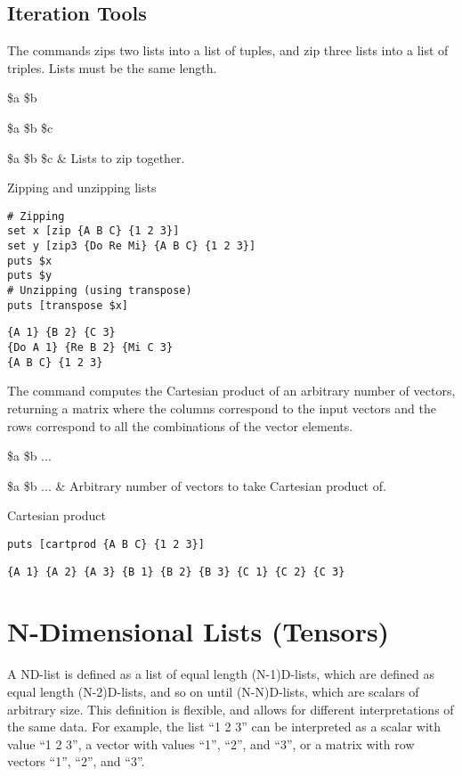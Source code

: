 \documentclass{article}
\begin{document}
\subsection{Iteration Tools}
The commands  zips two lists into a list of tuples, and  zip three lists into a list of triples. 
Lists must be the same length.
\begin{syntax}
 \$a \$b
\end{syntax}
\begin{syntax}
 \$a \$b \$c
\end{syntax}
\begin{args}
\$a \$b \$c & Lists to zip together.
\end{args}
\begin{example}{Zipping and unzipping lists}
\begin{lstlisting}
# Zipping
set x [zip {A B C} {1 2 3}]
set y [zip3 {Do Re Mi} {A B C} {1 2 3}]
puts $x
puts $y
# Unzipping (using transpose)
puts [transpose $x]
\end{lstlisting}
\tcblower
\begin{lstlisting}
{A 1} {B 2} {C 3}
{Do A 1} {Re B 2} {Mi C 3}
{A B C} {1 2 3}
\end{lstlisting}
\end{example}
The command  computes the Cartesian product of an arbitrary number of vectors, returning a matrix where the columns correspond to the input vectors and the rows correspond to all the combinations of the vector elements.
\begin{syntax}
 \$a \$b ...
\end{syntax}
\begin{args}
\$a \$b ... & Arbitrary number of vectors to take Cartesian product of.
\end{args}

\begin{example}{Cartesian product}
\begin{lstlisting}
puts [cartprod {A B C} {1 2 3}]
\end{lstlisting}
\tcblower
\begin{lstlisting}
{A 1} {A 2} {A 3} {B 1} {B 2} {B 3} {C 1} {C 2} {C 3}
\end{lstlisting}
\end{example}

\clearpage
\section{N-Dimensional Lists (Tensors)}
A ND-list is defined as a list of equal length (N-1)D-lists, which are defined as equal length (N-2)D-lists, and so on until (N-N)D-lists, which are scalars of arbitrary size.
This definition is flexible, and allows for different interpretations of the same data. 
For example, the list ``1 2 3'' can be interpreted as a scalar with value ``1 2 3'', a vector with values ``1'', ``2'', and ``3'', or a matrix with row vectors ``1'', ``2'', and ``3''. 
\end{document}
